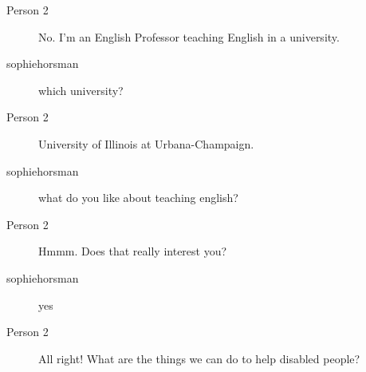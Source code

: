 \begin{itemize}
\begin{description}
\begin{description}
               \item [Person 2] No. I'm an English Professor teaching English in a university.
               \item [sophiehorsman] which university?
               \item [Person 2] University of Illinois at Urbana-Champaign.
               \item [sophiehorsman] what do you like about teaching english?
               \item [Person 2] Hmmm. Does that really interest you?
               \item [sophiehorsman] yes
               \item [Person 2] All right! What are the things we can do to help disabled people?
            \end{description}
      \end{description}



\end{itemize}
